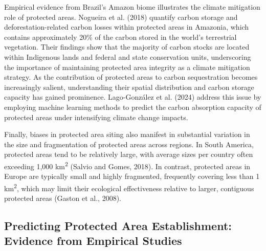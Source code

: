 \documentclass[12pt]{article}
\theoremstyle{break} %
\begin{document}
Empirical evidence from Brazil’s Amazon biome illustrates the climate mitigation role of protected areas. Nogueira et al. (2018) quantify carbon storage and deforestation-related carbon losses within protected areas in Amazonia, which contains approximately 20\% of the carbon stored in the world’s terrestrial vegetation. Their findings show that the majority of carbon stocks are located within Indigenous lands and federal and state conservation units, underscoring the importance of maintaining protected area integrity as a climate mitigation strategy. As the contribution of protected areas to carbon sequestration becomes increasingly salient, understanding their spatial distribution and carbon storage capacity has gained prominence. Lago-González et al. (2024) address this issue by employing machine learning methods to predict the carbon absorption capacity of protected areas under intensifying climate change impacts.

Finally, biases in protected area siting also manifest in substantial variation in the size and fragmentation of protected areas across regions. In South America, protected areas tend to be relatively large, with average sizes per country often exceeding 1,000 km\textsuperscript{2} (Salvio and Gomes, 2018). In contrast, protected areas in Europe are typically small and highly fragmented, frequently covering less than 1 km\textsuperscript{2}, which may limit their ecological effectiveness relative to larger, contiguous protected areas (Gaston et al., 2008).

\subsection{Predicting Protected Area Establishment: Evidence from Empirical Studies} \label{pa-prediction-empirical}
\end{document}
